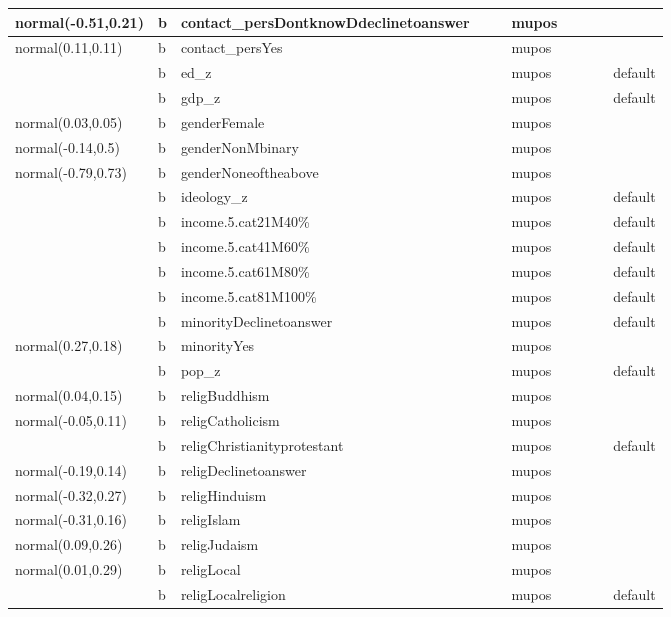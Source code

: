 \documentclass[
]{book}
\theoremstyle{definition}
\theoremstyle{definition}
\theoremstyle{definition}
\theoremstyle{definition}
\theoremstyle{remark}
\begin{document}
\begin{table}
\begin{tabular}[t]{l|l|l|l|l|l|l|l|l|l}
\hline
normal(-0.51,0.21) & b & contact\_persDontknowDdeclinetoanswer &  &  & mupos &  &  &  & \\
\hline
normal(0.11,0.11) & b & contact\_persYes &  &  & mupos &  &  &  & \\
\hline
 & b & ed\_z &  &  & mupos &  &  &  & default\\
\hline
 & b & gdp\_z &  &  & mupos &  &  &  & default\\
\hline
normal(0.03,0.05) & b & genderFemale &  &  & mupos &  &  &  & \\
\hline
normal(-0.14,0.5) & b & genderNonMbinary &  &  & mupos &  &  &  & \\
\hline
normal(-0.79,0.73) & b & genderNoneoftheabove &  &  & mupos &  &  &  & \\
\hline
 & b & ideology\_z &  &  & mupos &  &  &  & default\\
\hline
 & b & income.5.cat21M40\% &  &  & mupos &  &  &  & default\\
\hline
 & b & income.5.cat41M60\% &  &  & mupos &  &  &  & default\\
\hline
 & b & income.5.cat61M80\% &  &  & mupos &  &  &  & default\\
\hline
 & b & income.5.cat81M100\% &  &  & mupos &  &  &  & default\\
\hline
 & b & minorityDeclinetoanswer &  &  & mupos &  &  &  & default\\
\hline
normal(0.27,0.18) & b & minorityYes &  &  & mupos &  &  &  & \\
\hline
 & b & pop\_z &  &  & mupos &  &  &  & default\\
\hline
normal(0.04,0.15) & b & religBuddhism &  &  & mupos &  &  &  & \\
\hline
normal(-0.05,0.11) & b & religCatholicism &  &  & mupos &  &  &  & \\
\hline
 & b & religChristianityprotestant &  &  & mupos &  &  &  & default\\
\hline
normal(-0.19,0.14) & b & religDeclinetoanswer &  &  & mupos &  &  &  & \\
\hline
normal(-0.32,0.27) & b & religHinduism &  &  & mupos &  &  &  & \\
\hline
normal(-0.31,0.16) & b & religIslam &  &  & mupos &  &  &  & \\
\hline
normal(0.09,0.26) & b & religJudaism &  &  & mupos &  &  &  & \\
\hline
normal(0.01,0.29) & b & religLocal &  &  & mupos &  &  &  & \\
\hline
 & b & religLocalreligion &  &  & mupos &  &  &  & default\\

\end{tabular}
\end{table}
\end{document}
